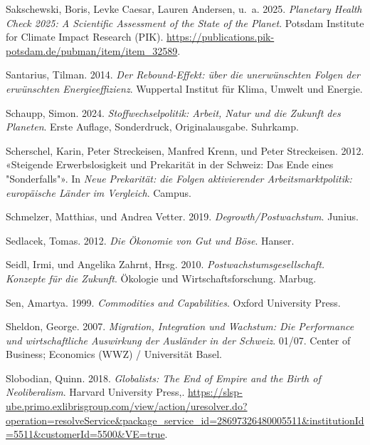 \documentclass[
  nswissgerman,
  a4paper,
  DIV=11,
  numbers=noendperiod,
  oneside,
  openany]{scrreprt}
\newlength{\cslhangindent}
\newenvironment{CSLReferences}[2] %
 {\begin{list}{}{%
  \setlength{\itemindent}{0pt}
  \setlength{\leftmargin}{0pt}
  \setlength{\parsep}{0pt}
  \ifodd #1
   \setlength{\leftmargin}{\cslhangindent}
   \setlength{\itemindent}{-1\cslhangindent}
  \fi
  \setlength{\itemsep}{#2\baselineskip}}}
 {\end{list}}
\begin{document}
\begin{CSLReferences}{1}{1}
Sakschewski, Boris, Levke Caesar, Lauren Andersen, u.~a. 2025.
\emph{Planetary Health Check 2025: A Scientific Assessment of the State
of the Planet}. Potsdam Institute for Climate Impact Research (PIK).
\url{https://publications.pik-potsdam.de/pubman/item/item_32589}.

Santarius, Tilman. 2014. \emph{Der Rebound-Effekt: über die
unerwünschten Folgen der erwünschten Energieeffizienz}. Wuppertal
Institut für Klima, Umwelt und Energie.

Schaupp, Simon. 2024. \emph{Stoffwechselpolitik: Arbeit, Natur und die
Zukunft des Planeten}. Erste Auflage, Sonderdruck, Originalausgabe.
Suhrkamp.

Scherschel, Karin, Peter Streckeisen, Manfred Krenn, und Peter
Streckeisen. 2012. {«Steigende Erwerbslosigkeit und Prekarität in der
Schweiz: Das Ende eines "Sonderfalls"»}. In \emph{Neue Prekarität: die
Folgen aktivierender Arbeitsmarktpolitik: europäische Länder im
Vergleich}. Campus.

Schmelzer, Matthias, und Andrea Vetter. 2019.
\emph{Degrowth/Postwachstum}. Junius.

Sedlacek, Tomas. 2012. \emph{Die Ökonomie von Gut und Böse}. Hanser.

Seidl, Irmi, und Angelika Zahrnt, Hrsg. 2010.
\emph{Postwachstumsgesellschaft. {Konzepte} für die {Zukunft}}. Ökologie
und {Wirtschaftsforschung}. Marbug.

Sen, Amartya. 1999. \emph{Commodities and {Capabilities}}. Oxford
University Press.

Sheldon, George. 2007. \emph{Migration, Integration und Wachstum: Die
Performance und wirtschaftliche Auswirkung der Ausländer in der
Schweiz}. 01/07. Center of Business; Economics (WWZ) / Universität
Basel.

Slobodian, Quinn. 2018. \emph{Globalists: The End of Empire and the
Birth of Neoliberalism}. Harvard University Press,.
\url{https://slsp-ube.primo.exlibrisgroup.com/view/action/uresolver.do?operation=resolveService&package_service_id=28697326480005511&institutionId=5511&customerId=5500&VE=true}.


\end{CSLReferences}
\end{document}
